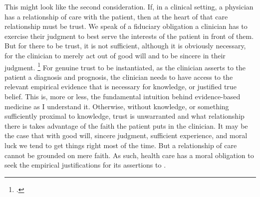 \documentclass[letterpaper,notitlepage,12pt]{article}
\begin{document}
This might look like the second consideration.
If, in a clinical setting, a physician has a relationship of care with the
patient, then at the heart of that care relationship must be trust.
We speak of a fiduciary obligation a clinician has to exercise their judgment
to best serve the interests of the patient in front of them.
But for there to be trust, it is not sufficient, although it is obviously
necessary, for the clinician to merely act out of good will and to be sincere in
their judgment.
\footcite{clifford
353}
For genuine trust to be instantiated, as the clinician asserts to the patient a
diagnosis and prognosis, the clinician needs to have access to the relevant
empirical evidence that is necessary for knowledge, or justified true belief.
This is, more or less, the fundamental intuition behind evidence-based medicine
as I understand it.
Otherwise, without knowledge, or something sufficiently proximal to knowledge,
trust is unwarranted and what relationship there is takes advantage of the faith
the patient puts in the clinician.
It may be the case that with good will, sincere judgment, sufficient
experience, and moral luck we tend to get things right most of the time.
But a relationship of care cannot be grounded on mere faith.
As such, health care has a moral obligation to seek the empirical justifications
for its assertions to .
\end{document}
